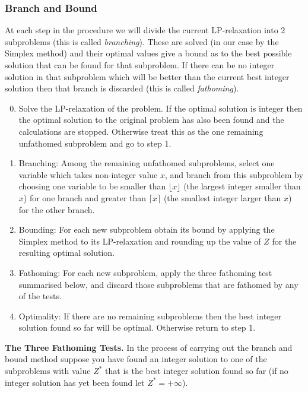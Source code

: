 \subsubsection{Branch and Bound}

At each step in the procedure we will divide the current LP-relaxation into 2 subproblems (this is called \textit{branching}). These are solved (in our case by the Simplex method) and their optimal values give a bound as to the best possible solution that can be found for that subproblem. If there can be no integer solution in that subproblem which will be better than the current best integer solution then that branch is discarded (this is called \textit{fathoming}). \\

\begin{enumerate}[label=Step \arabic*.]
    \setcounter{enumi}{-1}
    \item Solve the LP-relaxation of the problem. If the optimal solution is integer then the optimal solution to the original problem has also been found and the calculations are stopped. Otherwise treat this as the one remaining unfathomed subproblem and go to step 1.
    \item Branching: Among the remaining unfathomed subproblems, select one variable which takes non-integer value \(x\), and branch from this subproblem by choosing one variable to be smaller than \(\lfloor x \rfloor\) (the largest integer smaller than \(x\)) for one branch and greater than \(\lceil x \rceil\) (the smallest integer larger than \(x\)) for the other branch.
    \item Bounding: For each new subproblem obtain its bound by applying the Simplex method to its LP-relaxation and rounding up the value of \(Z\) for the resulting optimal solution.
    \item Fathoming: For each new subproblem, apply the three fathoming test summarised below, and discard those subproblems that are fathomed by any of the tests.
    \item Optimality: If there are no remaining subproblems then the best integer solution found so far will be optimal. Otherwise return to step 1.
\end{enumerate}

\textbf{The Three Fathoming Tests.}
In the process of carrying out the branch and bound method suppose you have found an integer solution to one of the subproblems with value \(Z^*\) that is the best integer solution found so far (if no integer solution has yet been found let \(Z^* = +\infty\)).


